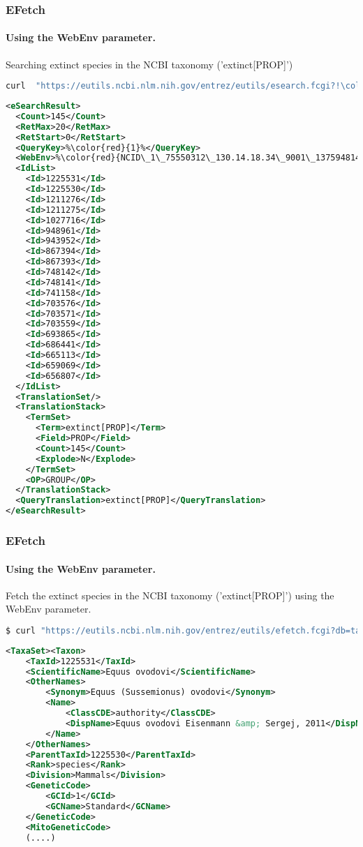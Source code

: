 \documentclass{beamer}
\begin{document}
\begin{frame}[fragile]
\frametitle{EFetch}
\framesubtitle{Using the WebEnv parameter.}
Searching extinct species in the NCBI taxonomy ('extinct[PROP]') 
\begin{lstlisting}[language=bash,basicstyle=\tiny,breaklines=true,escapechar=\!]
curl  "https://eutils.ncbi.nlm.nih.gov/entrez/eutils/esearch.fcgi?!\color{red}{usehistory=y}!&db=taxonomy&term=extinct%5BPROP%5D"
\end{lstlisting}

\begin{lstlisting}[language=xml,basicstyle=\tiny,breaklines=false,escapechar=\%]
<eSearchResult>
  <Count>145</Count>
  <RetMax>20</RetMax>
  <RetStart>0</RetStart>
  <QueryKey>%\color{red}{1}%</QueryKey>
  <WebEnv>%\color{red}{NCID\_1\_75550312\_130.14.18.34\_9001\_1375948145\_325582538}%</WebEnv>
  <IdList>
    <Id>1225531</Id>
    <Id>1225530</Id>
    <Id>1211276</Id>
    <Id>1211275</Id>
    <Id>1027716</Id>
    <Id>948961</Id>
    <Id>943952</Id>
    <Id>867394</Id>
    <Id>867393</Id>
    <Id>748142</Id>
    <Id>748141</Id>
    <Id>741158</Id>
    <Id>703576</Id>
    <Id>703571</Id>
    <Id>703559</Id>
    <Id>693865</Id>
    <Id>686441</Id>
    <Id>665113</Id>
    <Id>659069</Id>
    <Id>656807</Id>
  </IdList>
  <TranslationSet/>
  <TranslationStack>
    <TermSet>
      <Term>extinct[PROP]</Term>
      <Field>PROP</Field>
      <Count>145</Count>
      <Explode>N</Explode>
    </TermSet>
    <OP>GROUP</OP>
  </TranslationStack>
  <QueryTranslation>extinct[PROP]</QueryTranslation>
</eSearchResult>
\end{lstlisting}
\end{frame}

\begin{frame}[fragile]
\frametitle{EFetch}
\framesubtitle{Using the WebEnv parameter.}

Fetch the extinct species in the NCBI taxonomy ('extinct[PROP]') using the WebEnv parameter.

\begin{lstlisting}[language=bash,basicstyle=\tiny,breaklines=true,escapechar=\!]
$ curl "https://eutils.ncbi.nlm.nih.gov/entrez/eutils/efetch.fcgi?db=taxonomy&!\color{red}{query\_key=1\&WebEnv=NCID\_1\_75550312\_130.14.18.34\_9001\_1375948145\_325582538}!&retmode=xml" 
\end{lstlisting}

\begin{lstlisting}[language=xml,basicstyle=\tiny,breaklines=false,escapechar=\%]
<TaxaSet><Taxon>
    <TaxId>1225531</TaxId>
    <ScientificName>Equus ovodovi</ScientificName>
    <OtherNames>
        <Synonym>Equus (Sussemionus) ovodovi</Synonym>
        <Name>
            <ClassCDE>authority</ClassCDE>
            <DispName>Equus ovodovi Eisenmann &amp; Sergej, 2011</DispName>
        </Name>
    </OtherNames>
    <ParentTaxId>1225530</ParentTaxId>
    <Rank>species</Rank>
    <Division>Mammals</Division>
    <GeneticCode>
        <GCId>1</GCId>
        <GCName>Standard</GCName>
    </GeneticCode>
    <MitoGeneticCode>
    (....)
\end{lstlisting}
\end{frame}
\end{document}
